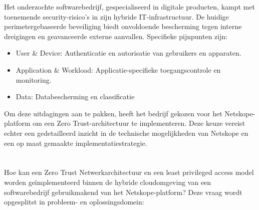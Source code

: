 
Het onderzochte softwarebedrijf, gespecialiseerd in digitale producten, kampt met toenemende security-risico’s in zijn hybride IT-infrastructuur. 
De huidige perimetergebaseerde beveiliging biedt onvoldoende bescherming tegen interne dreigingen en geavanceerde externe aanvallen. 
Specifieke pijnpunten zijn:

\begin{itemize}
  \item User \& Device: Authenticatie en autorisatie van gebruikers en apparaten.
	\item Application \& Workload: Applicatie-specifieke toegangscontrole en monitoring.
  \item Data: Databescherming en classificatie
\end{itemize}

Om deze uitdagingen aan te pakken, heeft het bedrijf gekozen voor het Netskope-platform om een Zero Trust-architectuur te implementeren. Deze keuze vereist echter een gedetailleerd inzicht in de technische mogelijkheden van Netskope en een op maat gemaakte implementatiestrategie.

\section{}%
\label{sec:onderzoeksvraag}


Hoe kan een Zero Trust Netwerkarchitectuur en een least privileged access model worden geïmplementeerd binnen de hybride cloudomgeving van een softwarebedrijf gebruikmakend van het Netskope-platform?
Deze vraag wordt opgesplitst in probleem- en oplossingsdomein:

